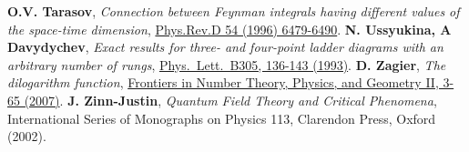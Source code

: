 \documentclass[oneside]{amsart}
\theoremstyle{plain}
\newcommand*{\doilink}[2]{\href{https://doi.org/\detokenize{#2}}{#1}}
\begin{document}
\begin{thebibliography}{99}
 {\bf O.V. Tarasov}, {\it Connection between Feynman integrals having different values of the space-time dimension}, \doilink{Phys.Rev.D 54 (1996) 6479-6490}{10.1103/PhysRevD.54.6479}.
 {\bf N. Ussyukina, A Davydychev}, {\it Exact results for three- and four-point ladder diagrams with an arbitrary number of rungs}, \doilink{Phys.\ Lett.\ B305, 136-143 (1993)}{10.1016/0370-2693(93)91118-7}.
 {\bf D. Zagier}, {\it The dilogarithm function}, \doilink{Frontiers in Number Theory, Physics, and Geometry II, 3-65 (2007)}{10.1007/978-3-540-30308-4_1}.
 {\bf J. Zinn-Justin}, {\it Quantum Field Theory and Critical Phenomena}, International Series of Monographs on Physics 113, Clarendon Press, Oxford (2002).
\end{thebibliography}
\end{document}
